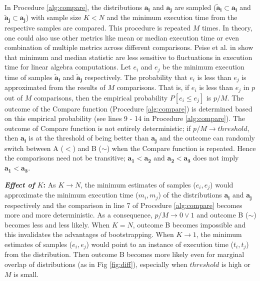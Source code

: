 \documentclass[conference]{IEEEtran}
\newcommand{\p}[1]{{\color{blue} Pdj: #1}}
\begin{document}
In Procedure \ref{alg:compare}, the distributions $\mathbf{a_i}$ and $\mathbf{a_j}$ are sampled ($\mathbf{\tilde{a}_i} \subset \mathbf{a_i}$ and $\mathbf{\tilde{a}_j} \subset \mathbf{a_j}$) with sample size $K < N $ and the minimum
execution time from the respective samples are compared. This procedure is repeated $M$ times. In theory, one could
also use other metrics like mean or median execution time or even combination of multiple metrics across different
comparisons. Peise et al. in \cite{peisethesis} show that minimum and median statistic are less sensitive to fluctuations in execution time for linear algebra computations.  Let $e_i$ and $e_j$ be the minimum execution time of samples  $\mathbf{\tilde{a}_i}$ and $\mathbf{\tilde{a}_j}$ respectively. The probability that $e_i$ is less than $e_j$ is approximated from the results of $M$ comparisons. That is, if $e_i$ is less than $e_j$ in $p$ out of $M$ comparisons, then the empirical probability $P[e_i \le e_j]$ is $p/M$. The outcome of the Compare function (Procedure \ref{alg:compare}) is determined based on this empirical probability (see lines 9 - 14 in Procedure \ref{alg:compare}). The outcome of Compare function is not entirely deterministic; if $p/M \to threshold$, then  $\mathbf{a_i}$ is at the threshold of being better than $\mathbf{a_j}$ and the outcome can randomly switch between A ($<$) and B ($\sim$) when the Compare function is repeated. Hence the comparisons need not be transitive;  $\mathbf{a_1} < \mathbf{a_2}$ and
$\mathbf{a_2} < \mathbf{a_3} $ does not imply $\mathbf{a_1} < \mathbf{a_3}$.

\textbf{\textit{Effect of} $K$:} As $K \to N$, the minimum estimates of samples ($e_i, e_j$) would approximate the minimum execution time ($m_i, m_j$) of the distributions $\mathbf{a_i}$ and $\mathbf{a_j}$ respectively and the comparison in line 7 of Procedure \ref{alg:compare} becomes more and more deterministic. As a consequence, $p/M \to 0 \lor 1$ and outcome B ($\sim$) becomes less and less likely. When $K=N$, outcome B becomes impossible and this invalidates the advantages of bootstrapping. When $K \to 1$, the minimum estimates of samples ($e_i, e_j$) would point to an instance of execution time ($t_i, t_j$) from the distribution. Then outcome B becomes more likely even for marginal overlap of distributions (as in Fig \ref{fig:diff}), especially when $threshold$ is high or $M$ is small.
\end{document}
